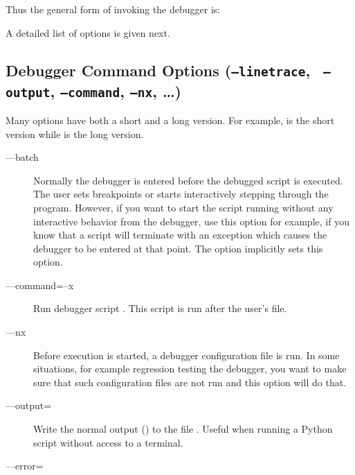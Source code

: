 Thus the general form of invoking the debugger is:

   

A detailed list of options is given next.

\subsection{Debugger Command Options ({\tt --linetrace}, {\tt
    --output}, {\tt --command}, {\tt --nx}, \ldots)\label{subsection-switches}}

Many options have both a short and a long version. For example,
 is the short version while  is the long
version.

\begin{description} 

\item[--{}--batch]

Normally the debugger is entered before the debugged script is
executed. The user sets breakpoints or starts interactively stepping
through the program. However, if you want to start the script running
without any interactive behavior from the debugger, use this option
for example, if you know that a script will terminate with an
exception which causes the debugger to be entered at that point. The
 option implicitly sets this option.

\item[--{}--command=\code{\Large{|}}--x ]\label{switch:command}

Run debugger script . This script is run after
the user's  file.

\item[--{}--nx\code{\Large{|}}]\label{switch:nx}

Before execution is started, a debugger configuration file
 is run. In some situations, for example regression
testing the debugger, you want to make sure that such configuration
files are not run and this option will do that.

\item[--{}--output=]

Write the normal output () to the file
. Useful when running a Python script without access to
a terminal.

\item[--{}--error=]


\end{description}
